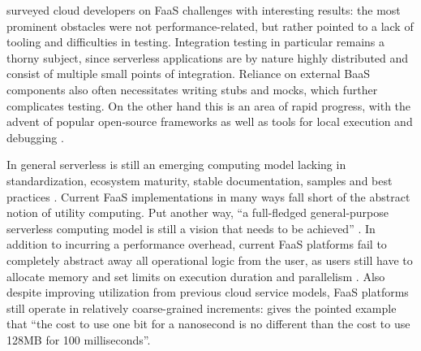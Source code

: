 \textcite{leitner18industrialpractice} surveyed cloud developers on FaaS challenges with interesting results: the most prominent obstacles were not performance-related, but rather pointed to a lack of tooling and difficulties in testing. Integration testing in particular remains a thorny subject, since serverless applications are by nature highly distributed and consist of multiple small points of integration. Reliance on external BaaS components also often necessitates writing stubs and mocks, which further complicates testing. On the other hand this is an area of rapid progress, with the advent of popular open-source frameworks as well as tools for local execution and debugging \parencite{robert2016serverlessarchitectures}.

In general serverless is still an emerging computing model lacking in standardization, ecosystem maturity, stable documentation, samples and best practices \parencite{cncf18serverlessWG}. Current FaaS implementations in many ways fall short of the abstract notion of utility computing. Put another way, ``a full-fledged general-purpose serverless computing model is still a vision that needs to be achieved'' \parencite{buyya2017manifesto}. In addition to incurring a performance overhead, current FaaS platforms fail to completely abstract away all operational logic from the user, as users still have to allocate memory and set limits on execution duration and parallelism \parencite{van2017spec}. Also despite improving utilization from previous cloud service models, FaaS platforms still operate in relatively coarse-grained increments: \textcite{eivy2017wary} gives the pointed example that ``the cost to use one bit for a nanosecond is no different than the cost to use 128MB for 100 milliseconds''.

